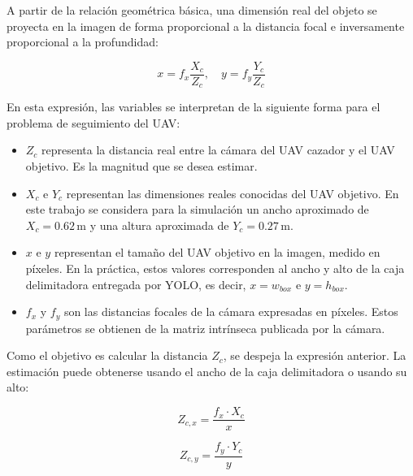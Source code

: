 \vspace{0.3cm}

A partir de la relación geométrica básica, una dimensión real del objeto se proyecta en la imagen de forma proporcional a la distancia focal e inversamente proporcional a la profundidad:

\begin{equation}
x = f_x \frac{X_c}{Z_c}, \quad y = f_y \frac{Y_c}{Z_c}
\end{equation}

\vspace{0.3cm}

En esta expresión, las variables se interpretan de la siguiente forma para el problema de seguimiento del UAV:

\begin{itemize}
    \item $Z_c$ representa la distancia real entre la cámara del UAV cazador y el UAV objetivo. Es la magnitud que se desea estimar.
    \item $X_c$ e $Y_c$ representan las dimensiones reales conocidas del UAV objetivo. En este trabajo se considera para la simulación un ancho aproximado de $X_c = 0.62\,\mathrm{m}$ y una altura aproximada de $Y_c = 0.27\,\mathrm{m}$.
    \item $x$ e $y$ representan el tamaño del UAV objetivo en la imagen, medido en píxeles. En la práctica, estos valores corresponden al ancho y alto de la caja delimitadora entregada por YOLO, es decir, $x = w_{box}$ e $y = h_{box}$.
    \item $f_x$ y $f_y$ son las distancias focales de la cámara expresadas en píxeles. Estos parámetros se obtienen de la matriz intrínseca publicada por la cámara.
\end{itemize}

\vspace{0.3cm}

Como el objetivo es calcular la distancia $Z_c$, se despeja la expresión anterior. La estimación puede obtenerse usando el ancho de la caja delimitadora o usando su alto:

\begin{equation}
Z_{c,x} = \frac{f_x \cdot X_c}{x}
\end{equation}

\begin{equation}
Z_{c,y} = \frac{f_y \cdot Y_c}{y}
\end{equation}

\vspace{0.3cm}

